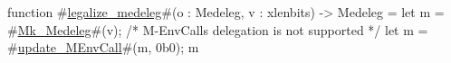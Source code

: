 function #\hyperref[sailRISCVzlegalizzezymedeleg]{legalize\_medeleg}#(o : Medeleg, v : xlenbits) -> Medeleg = {
  let m = #\hyperref[sailRISCVzMkzyMedeleg]{Mk\_Medeleg}#(v);
  /* M-EnvCalls delegation is not supported */
  let m = #\hyperref[sailRISCVzupdatezyMEnvCall]{update\_MEnvCall}#(m, 0b0);
  m
}
